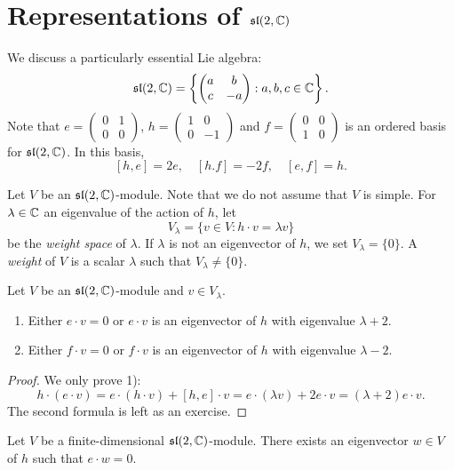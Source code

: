 \section{Representations of $\mathfrak{sl}(2,\mathbb{C})$}

We discuss a particularly essential Lie algebra: 
\[
\mathfrak{sl}(2,\mathbb{C})=\left\{\begin{pmatrix}
    a & b\\
    c & -a
    \end{pmatrix}:a,b,c\in\mathbb{C}\right\}.
\]
Note that 
$e=\begin{pmatrix}
        0&1\\
        0&0\end{pmatrix}$, $h=\begin{pmatrix}
        1&0\\
        0&-1\end{pmatrix}$ and $f=\begin{pmatrix}0&0\\1&0\end{pmatrix}$ 
        is an ordered basis for $\mathfrak{sl}(2,\mathbb{C})$. In this basis,
\[
[h,e]=2e,\quad
[h.f]=-2f,\quad
[e,f]=h.
\]

Let $V$ be an $\mathfrak{sl}(2,\mathbb{C})$-module. Note that we do not assume that $V$ is simple. 
For $\lambda\in\mathbb{C}$ an eigenvalue of the action of $h$, let
\[
V_{\lambda}=\{v\in V:h\cdot v=\lambda v\}
\]
be the \emph{weight space} of $\lambda$. 
If $\lambda$ is not an eigenvector of $h$, 
we set $V_{\lambda}=\{0\}$. A \emph{weight} of $V$  
is a scalar $\lambda$ such that $V_{\lambda}\ne\{0\}$. 

\begin{lemma}
    Let $V$ be an $\mathfrak{sl}(2,\mathbb{C})$-module and $v\in V_{\lambda}$. 
    \begin{enumerate}
        \item Either $e\cdot v=0$ or $e\cdot v$ is an eigenvector of $h$ with
            eigenvalue $\lambda+2$.
        \item Either $f\cdot v=0$ or $f\cdot v$ is an eigenvector of $h$ with
            eigenvalue $\lambda-2$.
    \end{enumerate} 
\end{lemma}

\begin{proof}
    We only prove 1):
    \[h\cdot(e\cdot v)=e\cdot(h\cdot v)+[h,e]\cdot v=e\cdot(\lambda v)+2e\cdot v=(\lambda+2)e\cdot v.
    \]
    The second formula is left as an exercise. 
\end{proof}

\begin{lemma}
\label{lem:maximal_weight}
    Let $V$ be a finite-dimensional $\mathfrak{sl}(2,\mathbb{C})$-module.
    There exists an eigenvector 
    $w\in V$ of $h$ such that $e\cdot w=0$. 
\end{lemma}

